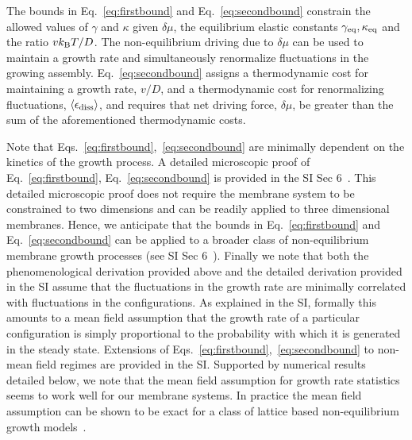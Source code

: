\documentclass[amsmath,preprintnumbers,10pt,nofootinbib,prl,twocolumn]{revtex4-1}
\begin{document}
The bounds in Eq.~\ref{eq:firstbound} and Eq.~\ref{eq:secondbound} constrain the allowed values of $\gamma$ and $\kappa$ given $\delta \mu$, the equilibrium elastic constants $\gamma_{\rm eq}, \kappa_{\rm eq}$ and the ratio $vk_{\rm B}T/D$. The non-equilibrium driving due to $\delta \mu$ can be used to maintain a growth rate and simultaneously renormalize fluctuations in the growing assembly. Eq.~\ref{eq:secondbound} assigns a thermodynamic cost for maintaining a growth rate, $v/D$, and a thermodynamic cost for renormalizing fluctuations, $\langle \epsilon_{\rm diss}\rangle$, and requires that net driving force, $\delta \mu$, be greater than the sum of the aforementioned thermodynamic costs. 

Note that Eqs.~\ref{eq:firstbound},~\ref{eq:secondbound} are minimally dependent on the kinetics of the growth process. A detailed microscopic proof of Eq.~\ref{eq:firstbound}, Eq.~\ref{eq:secondbound} is provided in the SI Sec 6~\cite{Supplementary}. This detailed microscopic proof does not require the membrane system to be constrained to two dimensions and can be readily applied to three dimensional membranes. Hence, we anticipate that the bounds in Eq.~\ref{eq:firstbound} and Eq.~\ref{eq:secondbound} can be applied to a broader class of non-equilibrium membrane growth processes (see SI Sec 6~\cite{Supplementary}). Finally we note that both the phenomenological derivation provided above and the detailed derivation provided in the SI assume that the fluctuations in the growth rate are minimally correlated with fluctuations in the configurations. As explained in the SI, formally this amounts to a mean field assumption that the growth rate of a particular configuration is simply proportional to the probability with which it is generated in the steady state. Extensions of Eqs.~\ref{eq:firstbound},~\ref{eq:secondbound} to non-mean field regimes are provided in the SI. Supported by numerical results detailed below, we note that the mean field assumption for growth rate statistics seems to work well for our membrane systems. In practice the mean field assumption can be shown to be exact for a class of lattice based non-equilibrium growth models~\cite{Nguyen2016}. 
\end{document}
